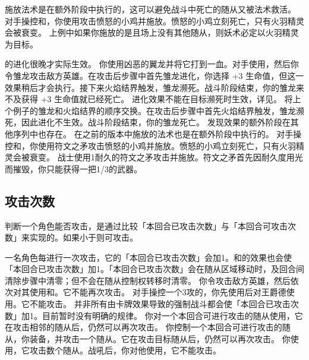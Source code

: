 施放法术是在额外阶段中执行的，这可以避免战斗中死亡的随从又被法术救活。
\example 对手操控和，你使用攻击愤怒的小鸡并施放。愤怒的小鸡立刻死亡，只有火羽精灵会被衰变。
\example 上例中如果你施放的是且场上没有其他随从，则妖术必定以火羽精灵为目标。

的进化很晚才实际生效。
\example 你使用凶恶的翼龙并将它打到一血。对手使用，然后你令雏龙攻击敌方英雄。在攻击后步骤中首先雏龙进化，你选择 +3 生命值，但这一效果稍后才会执行。接下来火焰结界触发，雏龙濒死。战斗阶段结束，你的雏龙来不及获得 +3 生命值就已经死亡。
\notice 进化效果不能在目标濒死时生效，详见。
\example 将上个例子的雏龙和火焰结界的顺序交换。在攻击后步骤中首先火焰结界触发，雏龙濒死，因此进化不生效。战斗阶段结束，你的雏龙死亡。
\notice {}发现效果的额外阶段在其他序列中也存在。
\notice {}在之前的版本中施放的法术也是在额外阶段中执行的。
\example {}对手操控和，你使用符文之矛攻击愤怒的小鸡并施放。愤怒的小鸡立刻死亡，只有火羽精灵会被衰变。
\example {}战士使用1耐久的符文之矛攻击并施放。符文之矛首先因耐久度用光而摧毁，你只能获得一把1/3的武器。

\subsection{攻击次数}

判断一个角色能否攻击，是通过比较「本回合已攻击次数」与「本回合可攻击次数」来实现的。如果小于则可攻击。

一名角色每进行一次攻击，它的「本回合已攻击次数」会加1。和的效果也会使「本回合已攻击次数」加1。「本回合已攻击次数」会在随从区域移动时，及回合间清除步骤中清零；但不会在随从控制权转移时清零。
\example 你令攻击敌方英雄，然后依次对其使用和。它不能再次攻击。
\example 对手操控一个3攻的，你先使用后对王爵德使用。它不能攻击。
\notice 并非所有由卡牌效果导致的强制战斗都会使「本回合已攻击次数」加1。目前暂时没有明确的规律。
\example 你对一个本回合可进行攻击的随从使用，它在攻击相邻的随从后，仍然可以再次攻击。
\example 你控制一个本回合可进行攻击的随从，你装备，并攻击一个随从。它在攻击目标随从后，仍然可以再次攻击。
\example 你使用，它攻击数个随从。战吼后，你对他使用，它不能攻击。

